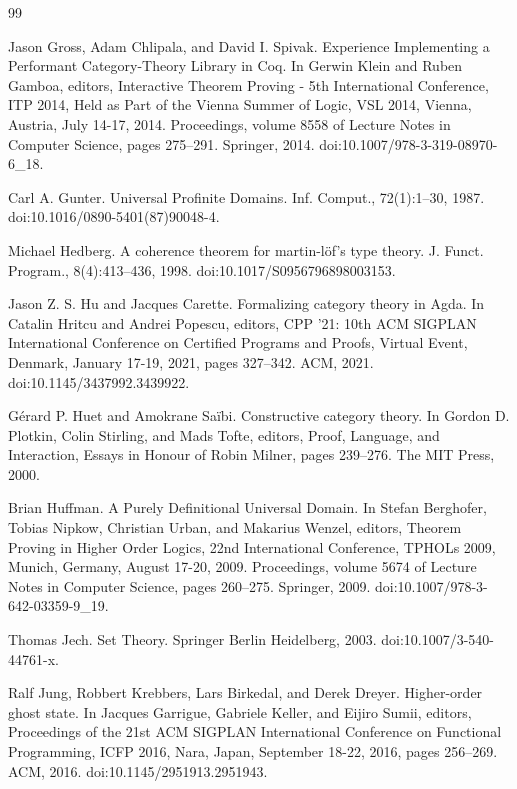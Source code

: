 \begin{thebibliography}{99}
\par\noindent    Jason Gross, Adam Chlipala, and David I. Spivak.  Experience Implementing a Performant Category-Theory Library in Coq.  In Gerwin Klein and Ruben Gamboa, editors, Interactive Theorem Proving - 5th International Conference, ITP 2014, Held as Part of the Vienna Summer of Logic, VSL 2014, Vienna, Austria, July 14-17, 2014. Proceedings, volume 8558 of Lecture Notes in Computer Science, pages 275–291. Springer, 2014.  doi:10.1007/978-3-319-08970-6\_18.  

\par\noindent    Carl A. Gunter.  Universal Profinite Domains.  Inf. Comput., 72(1):1–30, 1987.  doi:10.1016/0890-5401(87)90048-4.  

\par\noindent    Michael Hedberg.  A coherence theorem for martin-löf’s type theory.  J. Funct. Program., 8(4):413–436, 1998.  doi:10.1017/S0956796898003153.  

\par\noindent    Jason Z. S. Hu and Jacques Carette.  Formalizing category theory in Agda.  In Catalin Hritcu and Andrei Popescu, editors, CPP ’21: 10th ACM SIGPLAN International Conference on Certified Programs and Proofs, Virtual Event, Denmark, January 17-19, 2021, pages 327–342. ACM, 2021.  doi:10.1145/3437992.3439922.  

\par\noindent    Gérard P. Huet and Amokrane Saïbi.  Constructive category theory.  In Gordon D. Plotkin, Colin Stirling, and Mads Tofte, editors, Proof, Language, and Interaction, Essays in Honour of Robin Milner, pages 239–276. The MIT Press, 2000.  

\par\noindent    Brian Huffman.  A Purely Definitional Universal Domain.  In Stefan Berghofer, Tobias Nipkow, Christian Urban, and Makarius Wenzel, editors, Theorem Proving in Higher Order Logics, 22nd International Conference, TPHOLs 2009, Munich, Germany, August 17-20, 2009. Proceedings, volume 5674 of Lecture Notes in Computer Science, pages 260–275. Springer, 2009.  doi:10.1007/978-3-642-03359-9\_19.  

\par\noindent    Thomas Jech.  Set Theory.  Springer Berlin Heidelberg, 2003.  doi:10.1007/3-540-44761-x.  

\par\noindent    Ralf Jung, Robbert Krebbers, Lars Birkedal, and Derek Dreyer.  Higher-order ghost state.  In Jacques Garrigue, Gabriele Keller, and Eijiro Sumii, editors, Proceedings of the 21st ACM SIGPLAN International Conference on Functional Programming, ICFP 2016, Nara, Japan, September 18-22, 2016, pages 256–269. ACM, 2016.  doi:10.1145/2951913.2951943.  


\end{thebibliography}
